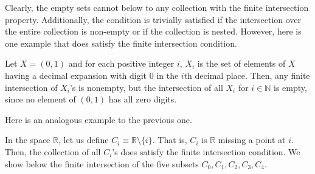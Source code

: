     Clearly, the empty sets cannot below to any collection with the finite intersection property. Additionally, the condition is trivially satisfied if the intersection over the entire collection is non-empty or if the collection is nested. However, here is one example that does satisfy the finite intersection condition. 

    \begin{example}
    Let $X = (0,1)$ and for each positive integer $i$, $X_i$ is the set of elements of $X$ having a decimal expansion with digit $0$ in the $i$th decimal place. Then, any finite intersection of $X_i$'s is nonempty, but the intersection of all $X_i$ for $i \in \mathbb{N}$ is empty, since no element of $(0,1)$ has all zero digits. 
    \end{example}

    Here is an analogous example to the previous one. 
    \begin{example}
    In the space $\mathbb{R}$, let us define $C_i \equiv \mathbb{R} \setminus \{i\}$. That is, $C_i$ is $\mathbb{R}$ missing a point at $i$. Then, the collection of all $C_i$'s does satisfy the finite intersection condition. We show below the finite intersection of the five subsets $C_0, C_1, C_2, C_3, C_4$. 
    \begin{center}
    \end{center}
    \end{example}


